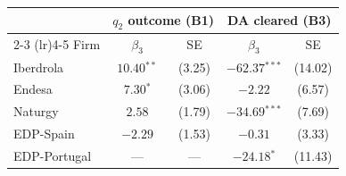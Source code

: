 \begin{tabular}{l c c c c}
\toprule
 & \multicolumn{2}{c}{$q_2$ outcome (B1)} & \multicolumn{2}{c}{DA cleared (B3)} \\
\cmidrule(lr){2-3} \cmidrule(lr){4-5}
Firm & $\beta_3$ & SE & $\beta_3$ & SE \\
\midrule
Iberdrola & $10.40$$^{**}$ & (3.25) & $-62.37$$^{***}$ & (14.02) \\
Endesa & $7.30$$^{*}$ & (3.06) & $-2.22$ & (6.57) \\
Naturgy & $2.58$ & (1.79) & $-34.69$$^{***}$ & (7.69) \\
EDP-Spain & $-2.29$ & (1.53) & $-0.31$ & (3.33) \\
EDP-Portugal & --- & --- & $-24.18$$^{*}$ & (11.43) \\
\bottomrule
\end{tabular}